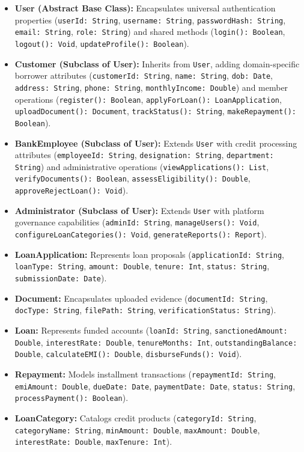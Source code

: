 \documentclass[12pt,a4paper,oneside]{report}
\begin{document}
\begin{itemize}
  \item \textbf{User (Abstract Base Class):} Encapsulates universal authentication properties (\texttt{userId: String}, \texttt{username: String}, \texttt{passwordHash: String}, \texttt{email: String}, \texttt{role: String}) and shared methods (\texttt{login(): Boolean}, \texttt{logout(): Void}, \texttt{updateProfile(): Boolean}).
  \item \textbf{Customer (Subclass of User):} Inherits from \texttt{User}, adding domain-specific borrower attributes (\texttt{customerId: String}, \texttt{name: String}, \texttt{dob: Date}, \texttt{address: String}, \texttt{phone: String}, \texttt{monthlyIncome: Double}) and member operations (\texttt{register(): Boolean}, \texttt{applyForLoan(): LoanApplication}, \texttt{uploadDocument(): Document}, \texttt{trackStatus(): String}, \texttt{makeRepayment(): Boolean}).
  \item \textbf{BankEmployee (Subclass of User):} Extends \texttt{User} with credit processing attributes (\texttt{employeeId: String}, \texttt{designation: String}, \texttt{department: String}) and administrative operations (\texttt{viewApplications(): List}, \texttt{verifyDocuments(): Boolean}, \texttt{assessEligibility(): Double}, \texttt{approveRejectLoan(): Void}).
  \item \textbf{Administrator (Subclass of User):} Extends \texttt{User} with platform governance capabilities (\texttt{adminId: String}, \texttt{manageUsers(): Void}, \texttt{configureLoanCategories(): Void}, \texttt{generateReports(): Report}).
  \item \textbf{LoanApplication:} Represents loan proposals (\texttt{applicationId: String}, \texttt{loanType: String}, \texttt{amount: Double}, \texttt{tenure: Int}, \texttt{status: String}, \texttt{submissionDate: Date}).
  \item \textbf{Document:} Encapsulates uploaded evidence (\texttt{documentId: String}, \texttt{docType: String}, \texttt{filePath: String}, \texttt{verificationStatus: String}).
  \item \textbf{Loan:} Represents funded accounts (\texttt{loanId: String}, \texttt{sanctionedAmount: Double}, \texttt{interestRate: Double}, \texttt{tenureMonths: Int}, \texttt{outstandingBalance: Double}, \texttt{calculateEMI(): Double}, \texttt{disburseFunds(): Void}).
  \item \textbf{Repayment:} Models installment transactions (\texttt{repaymentId: String}, \texttt{emiAmount: Double}, \texttt{dueDate: Date}, \texttt{paymentDate: Date}, \texttt{status: String}, \texttt{processPayment(): Boolean}).
  \item \textbf{LoanCategory:} Catalogs credit products (\texttt{categoryId: String}, \texttt{categoryName: String}, \texttt{minAmount: Double}, \texttt{maxAmount: Double}, \texttt{interestRate: Double}, \texttt{maxTenure: Int}).
\end{itemize}
\end{document}
